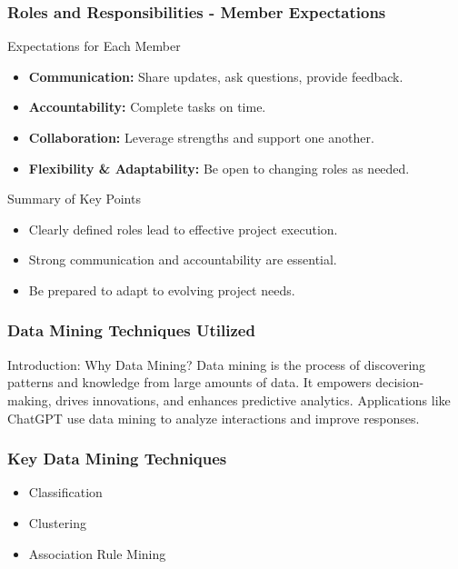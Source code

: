 \documentclass[aspectratio=169]{beamer}
\begin{document}
\begin{frame}[fragile]
    \frametitle{Roles and Responsibilities - Member Expectations}
    \begin{block}{Expectations for Each Member}
        \begin{itemize}
            \item \textbf{Communication:} Share updates, ask questions, provide feedback.
            \item \textbf{Accountability:} Complete tasks on time.
            \item \textbf{Collaboration:} Leverage strengths and support one another.
            \item \textbf{Flexibility \& Adaptability:} Be open to changing roles as needed.
        \end{itemize}
    \end{block}
    \begin{block}{Summary of Key Points}
        \begin{itemize}
            \item Clearly defined roles lead to effective project execution.
            \item Strong communication and accountability are essential.
            \item Be prepared to adapt to evolving project needs.
        \end{itemize}
    \end{block}
\end{frame}

\begin{frame}[fragile]
    \frametitle{Data Mining Techniques Utilized}
    \begin{block}{Introduction: Why Data Mining?}
        Data mining is the process of discovering patterns and knowledge from large amounts of data. 
        It empowers decision-making, drives innovations, and enhances predictive analytics.
        Applications like ChatGPT use data mining to analyze interactions and improve responses.
    \end{block}
\end{frame}

\begin{frame}[fragile]
    \frametitle{Key Data Mining Techniques}
    \begin{itemize}
        \item Classification
        \item Clustering
        \item Association Rule Mining
    \end{itemize}
\end{frame}
\end{document}
